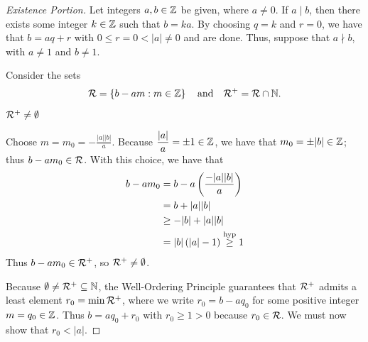 \documentclass{scrartcl}
\begin{document}
\begin{proof}[Existence Portion]
  Let integers $a,b \in \mathbb{Z}$ be given, where $a \neq 0$. If $a \mid b$, then there exists some integer $k \in \mathbb{Z}$ such that $b = ka$. By choosing $q=k$ and $r=0$, we have that $b =aq+r$ with $0\leq r=0 < |a| \neq 0$ and are done. Thus, suppose that $a \nmid b$, with $a \neq 1$ and $b \neq 1$.

  Consider the sets
  \[\mathcal{R} = \left\{b - am : m \in \mathbb{Z} \right\} \quad \mathrm{and} \quad \mathcal{R}^{+} = \mathcal{R} \cap \mathbb{N}.\]

  \begin{claim}[W.O.P. Condition]
    $\mathcal{R}^{+} \neq \emptyset$
  \end{claim}

  \begin{subproof}
    Choose $m = m_0 = -\displaystyle\frac{|a||b|}{a}$. Because $\displaystyle\frac{|a|}{a}=\pm 1 \in \mathbb{Z}$, we have that $m_0 = \pm |b| \in \mathbb{Z}$; thus $b-am_0 \in \mathcal{R}$. With this choice, we have that
    \begin{align*}
      b - am_0 &= b - a\left(\frac{-|a||b|}{a}\right) \\
      &= b + |a||b|  \\
      &\geq -|b| + |a||b|  \\
      &=|b|\left(|a| - 1\right) \overset{\mathrm{hyp}}{\geq} 1
    \end{align*}
    Thus $b-am_0 \in \mathcal{R}^{+}$, so $\mathcal{R}^{+} \neq \emptyset$.
  \end{subproof}

  Because $\emptyset \neq \mathcal{R}^{+} \subseteq \mathbb{N}$, the Well-Ordering Principle guarantees that $\mathcal{R}^{+}$ admits a least element $r_0=\min{\mathcal{R}^+}$, where we write $r_0 = b - aq_0$ for some positive integer $m = q_0 \in \mathbb{Z}$. Thus $b=aq_0+r_0$ with $r_0 \geq 1 > 0$ because $r_0 \in \mathcal{R}$. We must now show that $r_0 < |a|$.


\end{proof}
\end{document}
